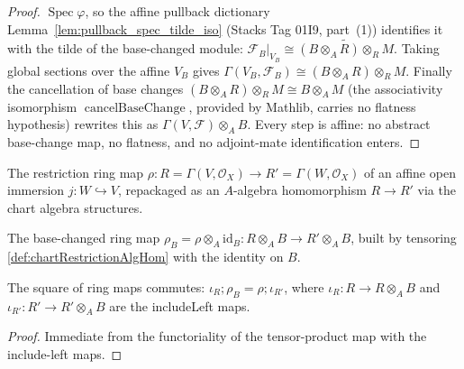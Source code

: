 \begin{lemma}
\begin{proof}
    \(\operatorname{Spec}\varphi\), so the affine pullback dictionary
    Lemma~\ref{lem:pullback_spec_tilde_iso} (Stacks Tag 01I9, part~(1)) identifies it with
    the tilde of the base-changed module:
    \(\mathcal{F}_B|_{V_B} \cong \widetilde{(B \otimes_A R) \otimes_R M}\). Taking global
    sections over the affine \(V_B\) gives
    \(\Gamma(V_B,\mathcal{F}_B) \cong (B \otimes_A R)\otimes_R M\). Finally the cancellation
    of base changes \((B \otimes_A R)\otimes_R M \cong B \otimes_A M\) (the associativity
    isomorphism \(\operatorname{cancelBaseChange}\), provided by Mathlib, carries no
    flatness hypothesis) rewrites this as \(\Gamma(V,\mathcal{F}) \otimes_A B\). Every step
    is affine: no abstract base-change map, no flatness, and no adjoint-mate identification
    enters.
  \end{proof}
\end{lemma}


\begin{definition}
  \label{def:chartRestrictionAlgHom}
  The restriction ring map \(\rho : R = \Gamma(V,\mathcal{O}_X)\to R' = \Gamma(W,\mathcal{O}_X)\) of an
  affine open immersion \(j : W\hookrightarrow V\), repackaged as an \(A\)-algebra homomorphism
  \(R\to R'\) via the chart algebra structures.
\end{definition}

\begin{definition}
  \label{def:chartBaseChangeRingMap}
  The base-changed ring map \(\rho_B = \rho\otimes_A\mathrm{id}_B : R\otimes_A B\to R'\otimes_A B\),
  built by tensoring \cref{def:chartRestrictionAlgHom} with the identity on \(B\).
\end{definition}

\begin{lemma}
  \label{lem:chartBaseChange_ring_square}
  The square of ring maps commutes: \(\iota_R \mathbin{;}\rho_B = \rho\mathbin{;}\iota_{R'}\), where
  \(\iota_R : R\to R\otimes_A B\) and \(\iota_{R'} : R'\to R'\otimes_A B\) are the includeLeft maps.
  \begin{proof}
    Immediate from the functoriality of the tensor-product map with the include-left maps.
  \end{proof}
\end{lemma}

